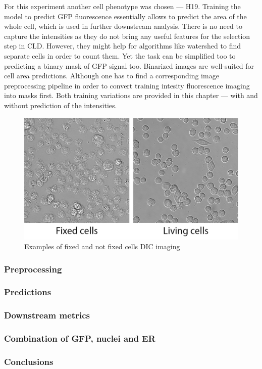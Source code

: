     For this experiment another cell phenotype was chosen --- H19. Training the model to predict GFP fluorescence essentially allows to predict the area of the whole cell, which is used in further downstream analysis. There is no need to capture the intensities as they do not bring any useful features for the selection step in CLD. However, they might help for algorithms like watershed to find separate cells in order to count them. Yet the task can be simplified too to predicting a binary mask of GFP signal too. Binarized images are well-suited for cell area predictions. Although one has to find a corresponding image preprocessing pipeline in order to convert training intesity fluorescence imaging into masks first. Both training variations are provided in this chapter --- with and without prediction of the intensities. 
    \begin{figure}[H]
        \begin{center}
            \includegraphics[width=0.5\linewidth]{bilder/gfp/fixed-not-fixed.png}
            \caption{Examples of fixed and not fixed cells DIC imaging}\label{fig:fixed-not-fixed}
        \end{center}
    \end{figure}
    \subsubsection{Preprocessing}
        
    \subsubsection{Predictions}
        
    \subsubsection{Downstream metrics}
        
    \subsubsection{Combination of GFP, nuclei and ER}
        
    \subsubsection{Conclusions}
        
